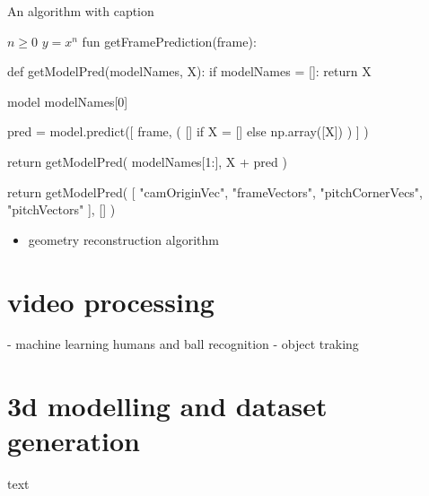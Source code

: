 \documentclass[
11pt,
twoside
]{report}
\begin{document}
\begin{algorithm}
\begin{algorithmic}


\caption{An algorithm with caption}\label{alg:cap}

\Require $n \geq 0$
\Ensure $y = x^n$
\State fun getFramePrediction(frame):

\State def getModelPred(modelNames, X):
    \State if modelNames = []:
        \State return X


    \State model \gets modelNames[0]


    pred = model.predict([
            frame,
            (
                [] if X = [] else np.array([X])
            )
        ]
    )


    return getModelPred(
        modelNames[1:],
        X + pred
    )


return getModelPred(
    [
        "camOriginVec",
        "frameVectors",
        "pitchCornerVecs",
        "pitchVectors"
    ],
    []
)
\end{algorithmic}
\end{algorithm}

\begin{itemize}
\item
  geometry reconstruction algorithm
\end{itemize}



\section{video processing}

- machine learning humans and ball recognition
- object traking


\section{3d modelling and dataset generation}


text
\end{document}
